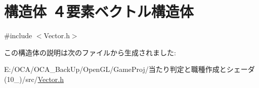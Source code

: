 \hypertarget{struct_xEF_xBC_x94_xE8_xA6_x81_xE7_xB4_xA0_xE3_x83_x99_xE3_x82_xAF_xE3_x83_x88_xE3_x83_xAB_xE6_xA7_x8B_xE9_x80_xA0_xE4_xBD_x93}{\section{構造体 ４要素ベクトル構造体}
\label{struct_xEF_xBC_x94_xE8_xA6_x81_xE7_xB4_xA0_xE3_x83_x99_xE3_x82_xAF_xE3_x83_x88_xE3_x83_xAB_xE6_xA7_x8B_xE9_x80_xA0_xE4_xBD_x93}
}


{\ttfamily \#include $<$Vector.\-h$>$}



この構造体の説明は次のファイルから生成されました\-:\begin{DoxyCompactItemize}
\item 
E\-:/\-O\-C\-A/\-O\-C\-A\-\_\-\-Back\-Up/\-Open\-G\-L/\-Game\-Proj/当たり判定と職種作成とシェーダ(10\-\_)/src/\hyperlink{_vector_8h}{Vector.\-h}\end{DoxyCompactItemize}
